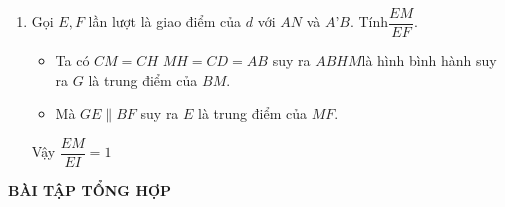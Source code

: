 \begin{bt}
{\begin{enumerate}
				Gọi $H$ là hình chiếu của $N$ suy ra $AH$ là hình chiếu của $AN$.\\
				Vì $E \in  AN$ nên $G \in  AH$ suy ra $G = AH \cap BM$.\\	
				Lưu ý rằng $A’B \parallel D’C \parallel NH$ suy ra $H \in DC$\\
				Cách dựng:
				\begin{itemize}
					\item  Kẻ $NH\parallel D’C$, cắt $DC$ tại $H$.
					\item  Dựng $G = AH\cap BM$.
					\item  Trong mặt phẳng $(ANH)$ kẻ $GE \parallel HN$, $E\in  AN$.
					\item  Vẽ đường thẳng $ME$, đó là đường thẳng d cần tìm. Dễ thấy $d$ cắt $A’B$.
				\end{itemize}
				\item Gọi $E, F$ lần lượt là giao điểm của $d$ với $AN$ và $A’B$. Tính$\dfrac{EM}{EF}$.
				\begin{itemize}
					\item Ta có $CM = CH$   $MH = CD = AB$  suy ra $ABHM $là hình bình hành suy ra  $G$ là trung điểm của $BM$.
					\item Mà $GE\parallel BF$  suy ra  $E$ là trung điểm của $MF$.
				\end{itemize}
				Vậy  $\dfrac{EM}{EI}=1$
			\end{enumerate}
		}
	\end{bt}
	\begin{center}
		\textbf{BÀI TẬP TỔNG HỢP}
	\end{center}
\setcounter{bt}{0}
